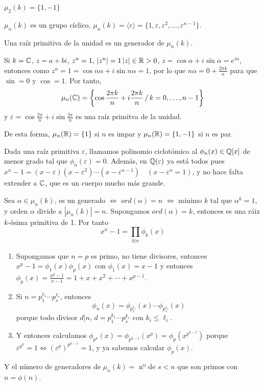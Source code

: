 \begin{ejem}
    $\mu_2(k)=\{1,-1\}$
\end{ejem}
\begin{prop}
    $\mu_n(k)$ es un grupo c\'iclico, $\mu_n(k) = \langle \varepsilon \rangle = \{1,\varepsilon, \varepsilon^2, \ldots, \varepsilon^{n-1}\}$. 
\end{prop}
\begin{defi}
    Una ra\'iz primitiva de la unidad es un generador de $\mu_n(k)$.
\end{defi}
\begin{ejem}
    Si $k=\mathbb{C}$, $z=a+bi$, $z^n=1, \, |z^n|=1 \, |z|\in \mathbb{R}>0$, $z=\cos \alpha+i \sin \alpha = e^{i\alpha}$, entonces como $z^n = 1 = \cos n\alpha + i \sin n\alpha = 1$, por lo que $n \alpha =0 + \frac{2\pi k}{n}$ para que $\sin =0$ y $\cos =1$. Por tanto, 
    $$\mu_n(\mathbb{C}) = \left\{ \cos \frac{2\pi k}{n} + i  \frac{2\pi k}{n} \, /\, k = 0, \ldots, n-1\right\}$$ y $\varepsilon = \cos  \frac{2\pi }{n} + i \sin  \frac{2\pi}{n}$ es una ra\'iz primitva de la unidad.

    De esta forma, $\mu_n(\mathbb{R}) = \{1\}$ si $n$ es impar y $\mu_n(\mathbb{R}) = \{1,-1\}$ si $n$ es par. 
\end{ejem}
\begin{defi}
    Dada una ra\'iz primitiva $\varepsilon$, llamamos  polinomio ciclot\'omico al $\phi_n(x) \in \mathbb{Q}[x]$ de menor grado tal que $\phi_n(\varepsilon)=0$. Adem\'as, en $\mathbb{Q}(\varepsilon)$ ya est\'a todos pues $x^n-1 = (x-\varepsilon)(x-\varepsilon^2) \cdots (x-\varepsilon^{n-1}) \quad (x-\varepsilon^n=1)$, y no hace falta extender a $\mathbb{C}$, que es un cuerpo mucho m\'as grande.  
\end{defi}
Sea $\alpha \in \mu_n(k)$, es un generado $\iff$ $ord(\alpha)=n$ $\iff$ m\'inimo $k$ tal que $\alpha^{k}=1$, y orden $\alpha$ divide a $|\mu_n(k)|=n$. Supongamos $ord(\alpha)=k$, entonces es una r\'aiz $k$-\'esima primitiva de 1. Por tanto
$$x^n-1 = \prod_{k|n} \phi_k(x)$$
\begin{enumerate}
    \item Supongamos que $n=p$ es primo, no tiene divisores, entonces $x^p-1 =\phi_1(x) \phi_p(x)$ con $\phi_1(x)=x-1$ y entonces $\phi_p(x)=\frac{x^p-1}{x-1} = 1+x+x^2+\cdots +x^{p-1}$.
    \item Si $n=p_1^{\ell_1} \cdots p_s^{\ell_s}$, entonces
    $$\phi_n(x) = \phi_{p_1^{\ell_1}}(x) \cdots \phi_{p_s^{\ell_s}}(x)$$
    porque todo divisor $d|n$, $d=p_1^{k_1}\cdots p_s^{k_s}$ con $k_i \leq \ell_i$. 
    \item Y entonces calculamos $\phi_{p^k}(x) = \phi_{p^{k-1}}(x^p) = \phi_p(x^{p^{k-1}})$ porque $\varepsilon^{p^k}=1 \iff (\varepsilon^p)^{p^{k-1}} = 1$, y ya sabemos calcular $\phi_p(x)$. 
\end{enumerate}
Y el n\'umero de generadores de $\mu_n(k) = $ nº de $s<n$ que son primos con $n =
\phi(n)$.

